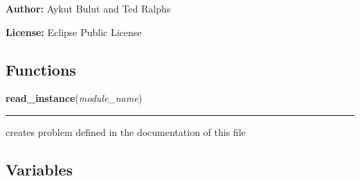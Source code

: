 \textbf{Author:} Aykut Bulut and Ted Ralphs



\textbf{License:} Eclipse Public License





  \subsection{Functions}

    \label{coinor:cuppy:genericSeparation:read_instance}

    \vspace{0.5ex}

\hspace{.8\funcindent}\begin{boxedminipage}{\funcwidth}

    \raggedright \textbf{read\_instance}(\textit{module\_name})

    \vspace{-1.5ex}

    \rule{\textwidth}{0.5\fboxrule}
\setlength{\parskip}{2ex}
    creates problem defined in the documentation of this file

\setlength{\parskip}{1ex}
    \end{boxedminipage}



  \subsection{Variables}

